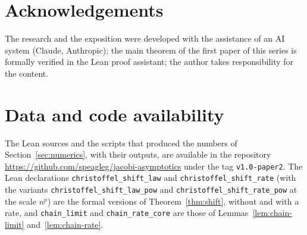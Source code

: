 
\section*{Acknowledgements}
The research and the exposition were developed with the assistance of an AI system (Claude, Anthropic); the main
theorem of the first paper of this series \cite{Paper1} is formally verified in the Lean proof assistant; the author
takes responsibility for the content.

\section*{Data and code availability}
{\raggedright The Lean sources and the scripts that produced the numbers of Section~\ref{sec:numerics}, with their
outputs, are available in the repository \url{https://github.com/speagleg/jacobi-asymptotics} under the tag
\texttt{v1.0-paper2}. The Lean declarations
\texttt{christoffel\_shift\_law} and \texttt{christoffel\_shift\_rate} (with the variants
\texttt{christoffel\_shift\_law\_pow} and \texttt{christoffel\_shift\_rate\_pow} at the scale $n^p$) are the formal
versions of Theorem~\ref{thm:shift}, without and with a rate, and \texttt{chain\_limit} and \texttt{chain\_rate\_core}
are those of Lemmas~\ref{lem:chain-limit} and~\ref{lem:chain-rate}.\par}
